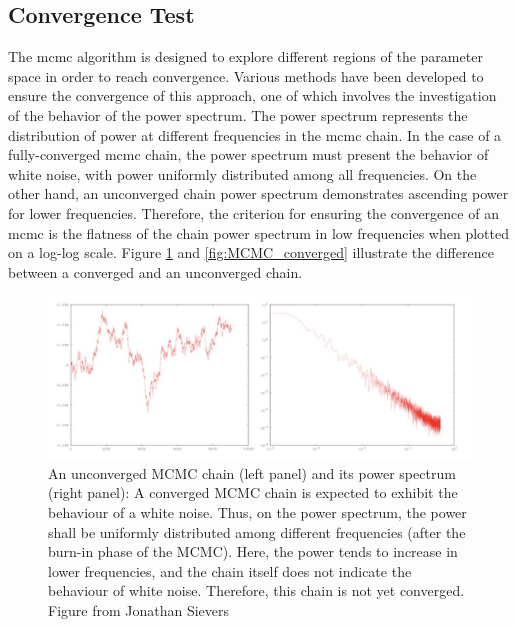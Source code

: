 \documentclass[12pt, TexShade, letterpaper]{report}
\begin{document}
\subsection{Convergence Test}
The \gls{mcmc} algorithm is designed to explore different regions of the parameter space in order to reach convergence. Various methods have been developed to ensure the convergence of this approach, one of which involves the investigation of the behavior of the power spectrum. The power spectrum represents the distribution of power at different frequencies in the \gls{mcmc} chain. In the case of a fully-converged \gls{mcmc} chain, the power spectrum must present the behavior of white noise, with power uniformly distributed among all frequencies. On the other hand, an unconverged chain power spectrum demonstrates ascending power for lower frequencies. Therefore, the criterion for ensuring the convergence of an \gls{mcmc} is the flatness of the chain power spectrum in low frequencies when plotted on a log-log scale. Figure \ref{fig:MCMC_unconverged} and \ref{fig:MCMC_converged} illustrate the difference between a converged and an unconverged chain.\par
\begin{figure}[h!]
\centering
\includegraphics[scale =0.9]{mcmc_uncoverged.jpg}
\caption[An unconverged MCMC chain and its power spectrum]{An unconverged MCMC chain (left panel) and its power spectrum (right panel): A converged MCMC chain is expected to exhibit the behaviour of a white noise. Thus, on the power spectrum, the power shall be uniformly distributed among different frequencies (after the burn-in phase of the MCMC). Here, the power tends to increase in lower frequencies, and the chain itself does not indicate the behaviour of white noise. Therefore, this chain is not yet converged. Figure from Jonathan Sievers}
\label{fig:MCMC_unconverged}
\end{figure}
\end{document}
